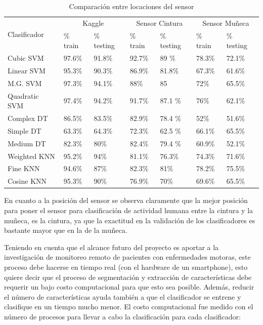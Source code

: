 \documentclass[11pt]{report}
\begin{document}
\begin{table}[H]
  \begin{tabular}{|l|l|l|l|l|l|l|}
    \hline
    \multirow{2}{*}{Clasificador} &
      \multicolumn{2}{c}{Kaggle} &
	\multicolumn{2}{c}{Sensor Cintura} &
	\multicolumn{2}{|c|}{Sensor Muñeca} \\
    & \% train  &  \% testing & \% train & \% testing  & \% train & \% testing \\
    \hline
    Cubic SVM & \cellcolor{blue!25}97.6\% & 91.8\% & \cellcolor{blue!25}92.7\% & \cellcolor{blue!25}89 \% & \cellcolor{blue!25}78.3\% & 72.1\% \\
    \hline
    Linear SVM & 95.3\% & 90.3\% & 86.9\% & 81.8\% & 67.3\% & 61.6\% \\
    \hline
    M.G. SVM & 97.3\% & 94.1\% & 88\% & 85 & 72\% & 65.5\% \\
    \hline
Quadratic SVM & 97.4\% & \cellcolor{blue!25}94.2\% & 91.7\% & 87.1 \% & 76\% & 62.1\% \\
    \hline
    Complex DT & 86.5\% & 83.5\% & 82.9\% & 78.4 \% & 52\% & 51.6\% \\
    \hline
    Simple DT & 63.3\% & 64.3\% & 72.3\% & 62.5 \% & 66.1\% & 65.5\% \\
    \hline
Medium DT &  82.3\% & 80\% & 82.4\% & 79.4 \% & 60.9\% & 52.1\% \\
    \hline
    Weighted KNN & 95.2\% & 94\% & 81.1\% & 76.3\% & 74.3\% & 71.6\% \\
    \hline
    Fine KNN & 94.6\% & 87\% & 82.3\% & 81\% & 78.2\% & \cellcolor{blue!25} 75.5\% \\
    \hline
Cosine KNN & 95.3\% & 90\% & 76.9\% & 70\% & 69.6\% & 65.5\% \\
    \hline
  \end{tabular}
\caption{Comparación entre locaciones del sensor}
\end{table}

\par
\medskip
\noindent
En cuanto a la posición del sensor se observa claramente que la mejor posición para poner el sensor para clasificación de actividad humana entre la cintura y la muñeca, es la cintura, ya que la exactitud en la validación de los clasificadores es bastante mayor que en la de la muñeca.


Teniendo en cuenta que el alcance futuro del proyecto es aportar a la investigación de monitoreo remoto de pacientes con enfermedades motoras, este proceso debe hacerse en tiempo real (con el hardware de un smartphone), esto quiere decir que el proceso de segmentación y extracción de características debe requerir un bajo costo computacional para que esto sea posible. Además, reducir el número de características ayuda también a que el clasificador se entrene y clasifique en un tiempo mucho menor. El costo computacional fue medido con el número de procesos para llevar a cabo la clasificación para cada clasificador:
\end{document}
